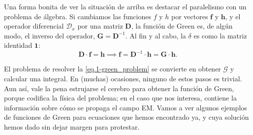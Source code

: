 Una forma bonita de ver la situación de arriba es destacar el paralelismo con un problema de álgebra. Si cambiamos las funciones \(f\) y \(h\) por vectores \(\mathbf{f}\) y \(\mathbf{h}\), y el operador diferencial \(\mathcal{D}_x\) por una matriz \(\mathbf{D}\), la función de Green es, de algún modo, el inverso del operador, \(\mathbf{G} = \mathbf{D}^{-1}\). Al fin y al cabo, la \(\delta\) es como la matriz identidad \(\mathbf{1}\):
\begin{equation}
    \mathbf{D}\cdot\mathbf{f} = \mathbf{h} \implies\mathbf{f} = \mathbf{D}^{-1}\cdot \mathbf{h} = \mathbf{G}\cdot \mathbf{h}.
\end{equation}

El problema de resolver la \cref{eq.1-green_problem} se convierte en obtener \(\mathcal{G}\) y calcular una integral. En (muchas) ocasiones, ninguno de estos pasos es trivial. Aun así, vale la pena estrujarse el cerebro para obtener la función de Green, porque codifica la física del problema; en el caso que nos interesa, contiene la información sobre cómo se propaga el campo EM. Vamos a ver algunos ejemplos de funciones de Green para ecuaciones que hemos encontrado ya, y cuya solución hemos dado sin dejar margen para protestar.

